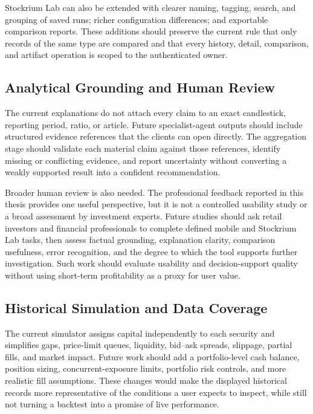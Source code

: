 Stockrium Lab can also be extended with clearer naming, tagging, search, and grouping of saved runs; richer configuration differences; and exportable comparison reports. These additions should preserve the current rule that only records of the same type are compared and that every history, detail, comparison, and artifact operation is scoped to the authenticated owner.

\subsection{Analytical Grounding and Human Review}

The current explanations do not attach every claim to an exact candlestick, reporting period, ratio, or article. Future specialist-agent outputs should include structured evidence references that the clients can open directly. The aggregation stage should validate each material claim against those references, identify missing or conflicting evidence, and report uncertainty without converting a weakly supported result into a confident recommendation.

Broader human review is also needed. The professional feedback reported in this thesis provides one useful perspective, but it is not a controlled usability study or a broad assessment by investment experts. Future studies should ask retail investors and financial professionals to complete defined mobile and Stockrium Lab tasks, then assess factual grounding, explanation clarity, comparison usefulness, error recognition, and the degree to which the tool supports further investigation. Such work should evaluate usability and decision-support quality without using short-term profitability as a proxy for user value.

\subsection{Historical Simulation and Data Coverage}

The current simulator assigns capital independently to each security and simplifies gaps, price-limit queues, liquidity, bid--ask spreads, slippage, partial fills, and market impact. Future work should add a portfolio-level cash balance, position sizing, concurrent-exposure limits, portfolio risk controls, and more realistic fill assumptions. These changes would make the displayed historical records more representative of the conditions a user expects to inspect, while still not turning a backtest into a promise of live performance.

